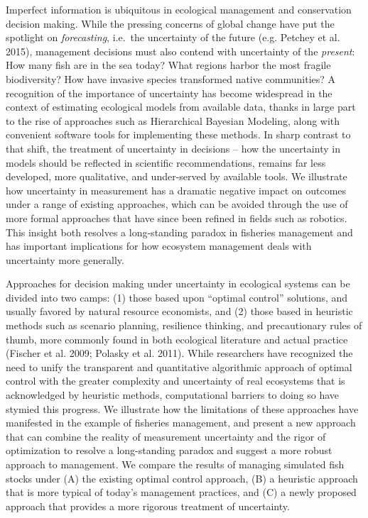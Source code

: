 \documentclass[3p]{elsarticle} %
\begin{document}
Imperfect information is ubiquitous in ecological management and
conservation decision making. While the pressing concerns of global
change have put the spotlight on \emph{forecasting}, i.e.~the
uncertainty of the future (e.g. Petchey et al. 2015), management
decisions must also contend with uncertainty of the \emph{present}: How
many fish are in the sea today? What regions harbor the most fragile
biodiversity? How have invasive species transformed native communities?
A recognition of the importance of uncertainty has become widespread in
the context of estimating ecological models from available data, thanks
in large part to the rise of approaches such as Hierarchical Bayesian
Modeling, along with convenient software tools for implementing these
methods. In sharp contrast to that shift, the treatment of uncertainty
in decisions -- how the uncertainty in models should be reflected in
scientific recommendations, remains far less developed, more
qualitative, and under-served by available tools. We illustrate how
uncertainty in measurement has a dramatic negative impact on outcomes
under a range of existing approaches, which can be avoided through the
use of more formal approaches that have since been refined in fields
such as robotics. This insight both resolves a long-standing paradox in
fisheries management and has important implications for how ecosystem
management deals with uncertainty more generally.

Approaches for decision making under uncertainty in ecological systems
can be divided into two camps: (1) those based upon ``optimal control''
solutions, and usually favored by natural resource economists, and (2)
those based in heuristic methods such as scenario planning, resilience
thinking, and precautionary rules of thumb, more commonly found in both
ecological literature and actual practice (Fischer et al. 2009; Polasky
et al. 2011). While researchers have recognized the need to unify the
transparent and quantitative algorithmic approach of optimal control
with the greater complexity and uncertainty of real ecosystems that is
acknowledged by heuristic methods, computational barriers to doing so
have stymied this progress. We illustrate how the limitations of these
approaches have manifested in the example of fisheries management, and
present a new approach that can combine the reality of measurement
uncertainty and the rigor of optimization to resolve a long-standing
paradox and suggest a more robust approach to management. We compare the
results of managing simulated fish stocks under (A) the existing optimal
control approach, (B) a heuristic approach that is more typical of
today's management practices, and (C) a newly proposed approach that
provides a more rigorous treatment of uncertainty.
\end{document}

